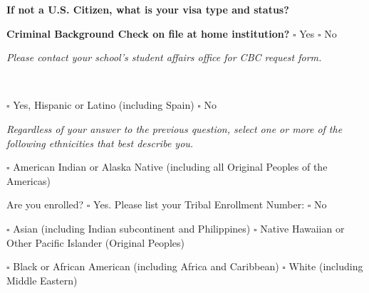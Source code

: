\documentclass[10pt]{article}
\begin{document}
\begin{center}
\vspace{0.4cm}

\noindent\textbf{\footnotesize If not a U.S. Citizen, what is your visa type and status?} \hrulefill  

\vspace{0.4cm}

\noindent\textbf{\footnotesize Criminal Background Check on file at home institution?} $\square$ Yes \quad $\square$ No  

\vspace{0.2cm}

\noindent\textit{\tiny Please contact your school’s student affairs office for CBC request form.}
\end{center}

\\
\begin{flushleft}
 \hspace{1cm} $\square$ \footnotesize Yes, Hispanic or Latino (including Spain) \hspace{1cm} $\square$ \footnotesize No  

\vspace{0.2cm}
\noindent\textit{\footnotesize Regardless of your answer to the previous question, select one or more of the following ethnicities that best describe you.}  

\vspace{0.2cm}
\noindent $\square$ \footnotesize American Indian or Alaska Native (including all Original Peoples of the Americas) \hspace{1cm} \underline{\hspace{4cm}}

\vspace{0.2cm}
\hspace{2cm} \footnotesize Are you enrolled? \hspace{1cm} $\square$ \footnotesize Yes. Please list your Tribal Enrollment Number: \underline{\hspace{4cm}} \hspace{1cm} $\square$ \footnotesize No

\vspace{0.2cm}
\noindent $\square$ \footnotesize Asian (including Indian subcontinent and Philippines) \hspace{2cm} $\square$ \footnotesize Native Hawaiian or Other Pacific Islander (Original Peoples)  

\vspace{0.2cm}
\noindent $\square$ \footnotesize Black or African American (including Africa and Caribbean) \hspace{2cm} $\square$ \footnotesize White (including Middle Eastern)  

\vspace{0.2cm}
 \hrulefill{\hspace{15cm}}
\end{flushleft}
\end{document}
